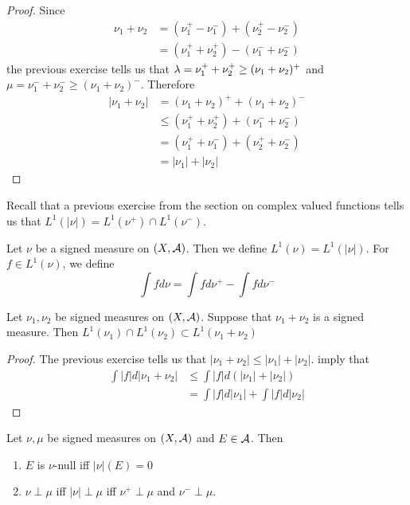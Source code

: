 \documentclass{book}
\begin{document}
	\begin{proof}
		Since 
		\begin{align*}
			\nu_1 + \nu_2 
			&= (\nu_1^+ - \nu_1^-) + (\nu_2^+ - \nu_2^-)\\
			&= (\nu_1^+ + \nu_2^+) - (\nu_1^- + \nu_2^-)
		\end{align*}
		the previous exercise tells us that $\lambda = \nu_1^+ + \nu_2^+ \geq (\nu_1 + \nu_2)^+$ and $ \mu = \nu_1^- + \nu_2^- \geq (\nu_1 + \nu_2)^-$. Therefore 
		\begin{align*}
			|\nu_1 + \nu_2| 
			&= (\nu_1 + \nu_2)^+  + (\nu_1 + \nu_2)^-\\
			& \leq (\nu_1^+ + \nu_2^+) + (\nu_1^- + \nu_2^-)\\
			&= (\nu_1^+ + \nu_1^-) + (\nu_2^+ + \nu_2^-)\\
			&= |\nu_1| + |\nu_2|
		\end{align*}
	\end{proof}
	
	\begin{note}
		Recall that a previous exercise from the section on complex valued functions tells us that $L^1(|\nu|) = L^1(\nu^+) \cap L^1(\nu^-)$.
	\end{note}
	
	\begin{defn}  
		Let $\nu$ be a signed measure on $(X, \mathcal{A})$. Then we define $L^1(\nu) = L^1(|\nu|)$. For $f \in L^1(\nu)$, we define $$\int f d \nu = \int f d \nu^+ - \int f d\nu^-$$
	\end{defn}
	
	\begin{ex}  
		Let $\nu_1, \nu_2$ be signed measures on $(X, \mathcal{A})$. Suppose that $\nu_1 + \nu_2$ is a signed measure. Then 
		$L^1(\nu_1)\cap L^1(\nu_2) \subset L^1(\nu_1 + \nu_2)$
	\end{ex}
	
	\begin{proof}
		The previous exercise tells us that $|\nu_1 + \nu_2| \leq |\nu_1| + |\nu_2|$.  imply that 
		\begin{align*}
			\int |f|d |\nu_1 + \nu_2| 
			& \leq \int |f| d(|\nu_1|+|\nu_2|)\\
			&= \int |f|d |\nu_1| + \int |f| d|\nu_2|
		\end{align*}
	\end{proof}
	
	\begin{ex}  
		Let $\nu, \mu$ be signed measures on $(X,\mathcal{A})$ and $E \in \mathcal{A}$. Then 
		\begin{enumerate}
			\item $E$ is $\nu$-null iff $|\nu|(E) = 0$
			\item $\nu \perp \mu$ iff $|\nu| \perp \mu$ iff $\nu^+ \perp \mu$ and $\nu^- \perp \mu$.
		\end{enumerate}
	\end{ex}
	
\end{document}
